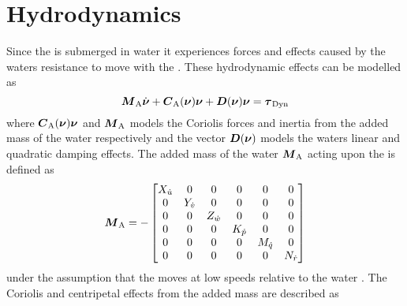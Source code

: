 \section{Hydrodynamics}
Since the \abbrROV is submerged in water it experiences forces and effects caused by the waters resistance to move with the \abbrROV. These hydrodynamic effects can be modelled as
\begin{equation}\label{eq:dyn}
\boldsymbol{M}_{\text{A}} \dot{\boldsymbol{\nu}} +\boldsymbol{C}_{\text{A}}(\boldsymbol{\nu})\boldsymbol{\nu} + \boldsymbol{D}(\boldsymbol{\nu})\boldsymbol{\nu} = \boldsymbol{\tau}_\text{{Dyn}} 
\end{equation} 
where $\boldsymbol{C}_{\text{A}}(\boldsymbol{\nu})\boldsymbol{\nu}$ and $\boldsymbol{M}_{\text{A}}$ models the Coriolis forces and inertia from the added mass of the water respectively and the vector $\boldsymbol{D}(\boldsymbol{\nu})$ models the waters linear and quadratic damping effects.
The added mass of the water $\boldsymbol{M}_\text{A}$ acting upon the \abbrROV is defined as
\begin{equation}
\boldsymbol{M}_\text{A} =
-\begin{bmatrix}
    X_{\dot{u}} & 0 & 0 & 0 & 0 & 0 \\
    0 & Y_{\dot{v}} & 0 & 0 & 0 & 0 \\
    0 & 0 & Z_{\dot{w}} & 0 & 0 & 0 \\
    0 & 0 & 0 & K_{\dot{p}}& 0 & 0 \\
    0 & 0 & 0 & 0 & M_{\dot{q}} & 0 \\
    0 & 0 & 0 & 0 & 0 & N_{\dot{r}} \\
    \end{bmatrix}
\end{equation}
under the assumption that the \abbrROV moves at low speeds relative to the water \citep[p. 121]{fossen2011}.
The Coriolis and centripetal effects from the added mass are described as
